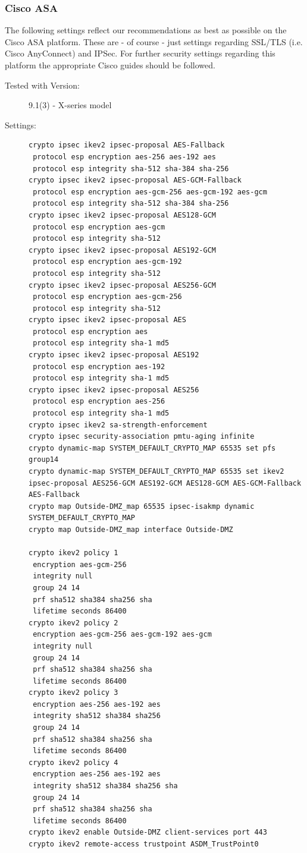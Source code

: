 \subsubsection{Cisco ASA}
The following settings reflect our recommendations as best as possible on the Cisco ASA platform. These are - of course - just settings regarding SSL/TLS (i.e. Cisco AnyConnect) and IPSec. For further security settings regarding this platform the appropriate Cisco guides should be followed.
\begin{description}
\item[Tested with Version:] 
9.1(3) - X-series model
\item[Settings:] \mbox{}
\begin{lstlisting}[breaklines]
crypto ipsec ikev2 ipsec-proposal AES-Fallback
 protocol esp encryption aes-256 aes-192 aes
 protocol esp integrity sha-512 sha-384 sha-256
crypto ipsec ikev2 ipsec-proposal AES-GCM-Fallback
 protocol esp encryption aes-gcm-256 aes-gcm-192 aes-gcm
 protocol esp integrity sha-512 sha-384 sha-256
crypto ipsec ikev2 ipsec-proposal AES128-GCM
 protocol esp encryption aes-gcm
 protocol esp integrity sha-512
crypto ipsec ikev2 ipsec-proposal AES192-GCM
 protocol esp encryption aes-gcm-192
 protocol esp integrity sha-512
crypto ipsec ikev2 ipsec-proposal AES256-GCM
 protocol esp encryption aes-gcm-256
 protocol esp integrity sha-512
crypto ipsec ikev2 ipsec-proposal AES
 protocol esp encryption aes
 protocol esp integrity sha-1 md5
crypto ipsec ikev2 ipsec-proposal AES192
 protocol esp encryption aes-192
 protocol esp integrity sha-1 md5
crypto ipsec ikev2 ipsec-proposal AES256
 protocol esp encryption aes-256
 protocol esp integrity sha-1 md5
crypto ipsec ikev2 sa-strength-enforcement
crypto ipsec security-association pmtu-aging infinite
crypto dynamic-map SYSTEM_DEFAULT_CRYPTO_MAP 65535 set pfs group14
crypto dynamic-map SYSTEM_DEFAULT_CRYPTO_MAP 65535 set ikev2 ipsec-proposal AES256-GCM AES192-GCM AES128-GCM AES-GCM-Fallback AES-Fallback
crypto map Outside-DMZ_map 65535 ipsec-isakmp dynamic SYSTEM_DEFAULT_CRYPTO_MAP
crypto map Outside-DMZ_map interface Outside-DMZ

crypto ikev2 policy 1
 encryption aes-gcm-256
 integrity null
 group 24 14
 prf sha512 sha384 sha256 sha
 lifetime seconds 86400
crypto ikev2 policy 2
 encryption aes-gcm-256 aes-gcm-192 aes-gcm
 integrity null
 group 24 14
 prf sha512 sha384 sha256 sha
 lifetime seconds 86400
crypto ikev2 policy 3
 encryption aes-256 aes-192 aes
 integrity sha512 sha384 sha256
 group 24 14
 prf sha512 sha384 sha256 sha
 lifetime seconds 86400
crypto ikev2 policy 4
 encryption aes-256 aes-192 aes
 integrity sha512 sha384 sha256 sha
 group 24 14
 prf sha512 sha384 sha256 sha
 lifetime seconds 86400
crypto ikev2 enable Outside-DMZ client-services port 443
crypto ikev2 remote-access trustpoint ASDM_TrustPoint0


\end{lstlisting}
\end{description}
